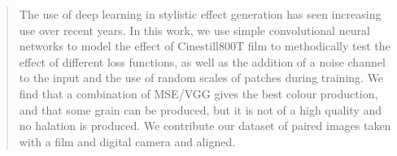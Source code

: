 \begin{abstract}

The use of deep learning in stylistic effect generation has seen increasing use over recent years. In this work, we use simple convolutional neural networks to model the effect of Cinestill800T film to methodically test the effect of different loss functions, as well as the addition of a noise channel to the input and the use of random scales of patches during training. We find that a combination of MSE/VGG gives the best colour production, and that some grain can be produced, but it is not of a high quality and no halation is produced. We contribute our dataset of paired images taken with a film and digital camera and aligned.

\end{abstract}